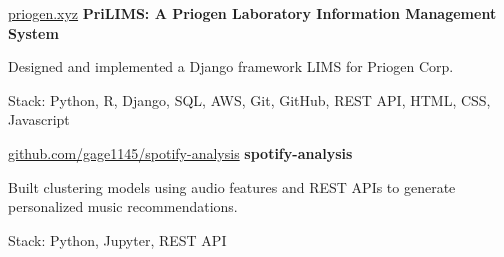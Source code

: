 \documentclass{resume}
\begin{document}
        \begin{software}{\href{https://priogen.xyz}{priogen.xyz}}
            \textbf{PriLIMS: A Priogen Laboratory Information Management System}
        \end{software}
        \begin{highlights}
            \item Designed and implemented a Django framework LIMS for Priogen Corp.
            \item Stack: Python, R, Django, SQL, AWS, Git, GitHub, REST API, HTML, CSS, Javascript 
        \end{highlights}
        
        \begin{software}{\href{https://github.com/gage1145/spotify-analysis}{github.com/gage1145/spotify-analysis}}
            \textbf{spotify-analysis}
        \end{software}
        \begin{highlights}
            \item Built clustering models using audio features and REST APIs to generate personalized music recommendations.
            \item Stack: Python, Jupyter, REST API 
        \end{highlights}




\end{document}

